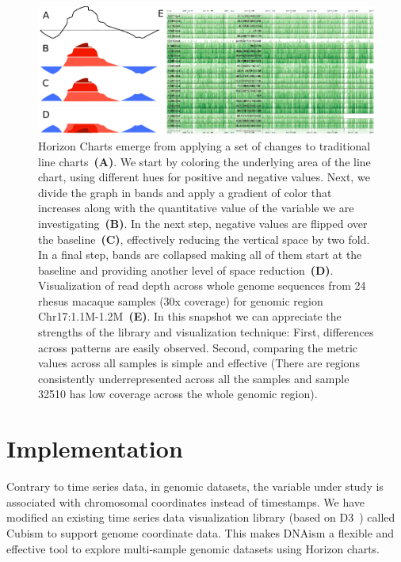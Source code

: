 \documentclass{bioinfo}
\begin{document}
\begin{figure}
\centerline{\includegraphics[width=1\textwidth,natwidth=485.65,natheight=187.53]{figure.pdf}}
\caption{
Horizon Charts emerge from applying a set of changes to traditional line
charts~\textbf{(A)}. We start by coloring the underlying area of the line chart,
using different hues for positive and negative values. Next, we divide the
graph in bands and apply a gradient of color that increases along with the
quantitative value of the variable we are investigating~\textbf{(B)}. In the
next step, negative values are flipped over the baseline~\textbf{(C)},
effectively reducing the vertical space by two fold. In a final step, bands are
collapsed making all of them start at the baseline and providing another level
of space reduction~\textbf{(D)}.  Visualization of read depth across whole
genome sequences from 24 rhesus macaque samples (30x coverage) for genomic
region Chr17:1.1M-1.2M~\textbf{(E)}. In this snapshot we can appreciate the
strengths of the library and visualization technique: First, differences across
patterns are easily observed.  Second, comparing the metric values across all
samples is simple and effective (There are regions consistently
underrepresented across all the samples and sample 32510 has low coverage
across the whole genomic region).
}\label{fig:01}
\end{figure}

\section{Implementation}

Contrary to time series data, in genomic datasets, the variable under study is
associated with chromosomal coordinates instead of timestamps. We have modified
an existing time series data visualization library (based on D3~\citep{2011-d3})
called Cubism to support genome coordinate data. This makes DNAism
a flexible and effective tool to explore multi-sample genomic datasets using
Horizon charts.
\end{document}
